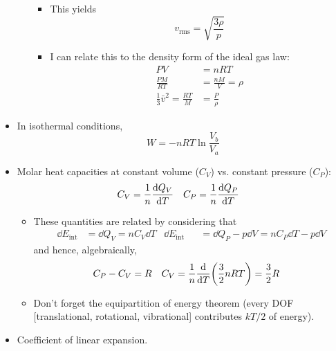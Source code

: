 \documentclass[../notes.tex]{subfiles}
\begin{document}
\begin{itemize}
\begin{itemize}
\begin{equation*}
        \end{equation*}
        \begin{itemize}
            \item This yields
            \begin{equation*}
                v_\text{rms} = \sqrt{\frac{3\rho}{p}}
            \end{equation*}
            \item I can relate this to the density form of the ideal gas law:
            \begin{align*}
                PV &= nRT\\
                \frac{PM}{RT} &= \frac{nM}{V} = \rho\\
                \frac{1}{3}\bar{v}^2 = \frac{RT}{M} &= \frac{P}{\rho}
            \end{align*}
        \end{itemize}
    \end{itemize}
    \item In isothermal conditions,
    \begin{equation*}
        W = -nRT\ln\frac{V_b}{V_a}
    \end{equation*}
    \item Molar heat capacities at constant volume ($C_V$) vs. constant pressure ($C_P$):
    \begin{align*}
        C_V &= \frac{1}{n}\dv{Q_V}{T}&
        C_P &= \frac{1}{n}\dv{Q_P}{T}
    \end{align*}
    \begin{itemize}
        \item These quantities are related by considering that
        \begin{align*}
            \dd{E_\text{int}} &= \dd{Q_V}
                = nC_V\dd{T}&
            \dd{E_\text{int}} &&= \dd{Q_P}-p\dd{V}
                = nC_P\dd{T}-p\dd{V}
        \end{align*}
        and hence, algebraically,
        \begin{align*}
            C_P-C_V &= R&
            C_V &= \frac{1}{n}\dv{T}(\frac{3}{2}nRT)
                = \frac{3}{2}R
        \end{align*}
        \item Don't forget the equipartition of energy theorem (every DOF [translational, rotational, vibrational] contributes $kT/2$ of energy).
    \end{itemize}
    \item Coefficient of linear expansion.
    \begin{equation*}

\end{equation*}
\end{itemize}
\end{document}
